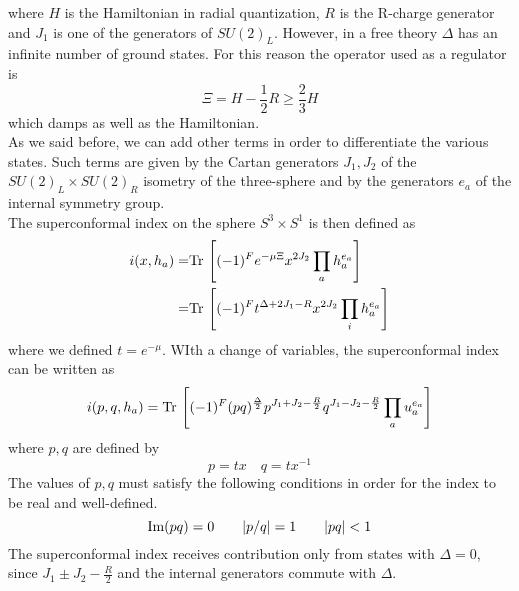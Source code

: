  where $H$ is the Hamiltonian in radial quantization, $R$ is the R-charge generator and $J_1$ is one of the generators of $SU(2)_L$. 
 However, in a free theory $\Delta$ has an infinite number of ground states. 
 For this reason the operator used as a regulator is \cite{Romelsberger:2005eg}
 \begin{equation}
 	\Xi = H - \frac{1}{2} R \geq \frac{2}{3} H 
 \end{equation}
 which damps as well as the Hamiltonian.\\
As we said before, we can add other terms in order to differentiate the various states.
Such terms are given by the Cartan generators $J_1, J_2$ of the $SU(2)_L \times SU(2)_R$ isometry of the three-sphere and by the generators $e_a$ of the internal symmetry group.\\
The superconformal index on the sphere $S^3 \times S^1$ is then defined as \cite{Romelsberger:2007ec}
\begin{align}
 i( x, h_a) =&
\mathrm{Tr } \, \left[ (-1)^F  e^{ - \mu \Xi} x^{2 J_2} \prod_a h_a^{e_a} \right] \\= &
\mathrm{Tr } \, \left[ (-1)^F  t^{\Delta +  2 J_1 - R} x^{2 J_2} \prod_i h_a^{e_a} \right] 
 \end{align} 
 where we defined $t = e^{- \mu}$.
WIth a change of variables, the superconformal index can be written as 
\begin{equation}
 i( p, q, h_a) =
 \Tr  \left[  (-1)^F 
 (pq)^{ \frac{\Delta}{2}} %
  p^{J_1 + J_2 - \frac{R}{2}} q^{J_1 - J_2 - \frac{R}{2} } \prod_a u_a^{e_a}    \right]
\end{equation}
where $p,q$ are defined by
\begin{equation}
p = t x \quad q = t x^{-1}
\end{equation}
The values of $p,q$ must satisfy the following conditions in order for the index to be real and well-defined.
\begin{equation}
\hbox{Im} (pq) =0 \qquad |p/q| =  1 \qquad | pq| < 1
\label{eqn:reality_convergence_condition_index}
\end{equation}
The superconformal index receives contribution only from states with $\Delta=0$, since $J_1 \pm J_2 - \frac{R}{2}$ and the internal generators commute with $\Delta$.
